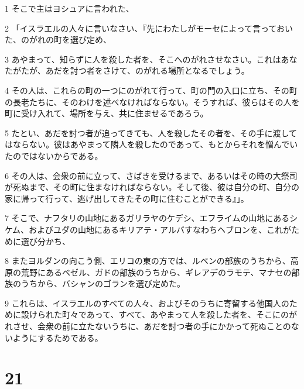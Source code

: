 \par 1 そこで主はヨシュアに言われた、
\par 2 「イスラエルの人々に言いなさい、『先にわたしがモーセによって言っておいた、のがれの町を選び定め、
\par 3 あやまって、知らずに人を殺した者を、そこへのがれさせなさい。これはあなたがたが、あだを討つ者をさけて、のがれる場所となるでしょう。
\par 4 その人は、これらの町の一つにのがれて行って、町の門の入口に立ち、その町の長老たちに、そのわけを述べなければならない。そうすれば、彼らはその人を町に受け入れて、場所を与え、共に住ませるであろう。
\par 5 たとい、あだを討つ者が追ってきても、人を殺したその者を、その手に渡してはならない。彼はあやまって隣人を殺したのであって、もとからそれを憎んでいたのではないからである。
\par 6 その人は、会衆の前に立って、さばきを受けるまで、あるいはその時の大祭司が死ぬまで、その町に住まなければならない。そして後、彼は自分の町、自分の家に帰って行って、逃げ出してきたその町に住むことができる』」。
\par 7 そこで、ナフタリの山地にあるガリラヤのケデシ、エフライムの山地にあるシケム、およびユダの山地にあるキリアテ・アルバすなわちヘブロンを、これがために選び分かち、
\par 8 またヨルダンの向こう側、エリコの東の方では、ルベンの部族のうちから、高原の荒野にあるベゼル、ガドの部族のうちから、ギレアデのラモテ、マナセの部族のうちから、バシャンのゴランを選び定めた。
\par 9 これらは、イスラエルのすべての人々、およびそのうちに寄留する他国人のために設けられた町々であって、すべて、あやまって人を殺した者を、そこにのがれさせ、会衆の前に立たないうちに、あだを討つ者の手にかかって死ぬことのないようにするためである。

\chapter{21}


